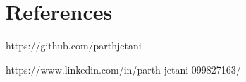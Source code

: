\documentclass[]{cv-style}          %
\begin{document}
\section{References}
  \vspace{-0.2cm}
\begin{entrylist}

\entry
  {}
  {https://github.com/parthjetani }
 


 

\end{entrylist}
\begin{entrylist}

\entry{}
  {https://www.linkedin.com/in/parth-jetani-099827163/}
 




\end{entrylist}
\end{document}
